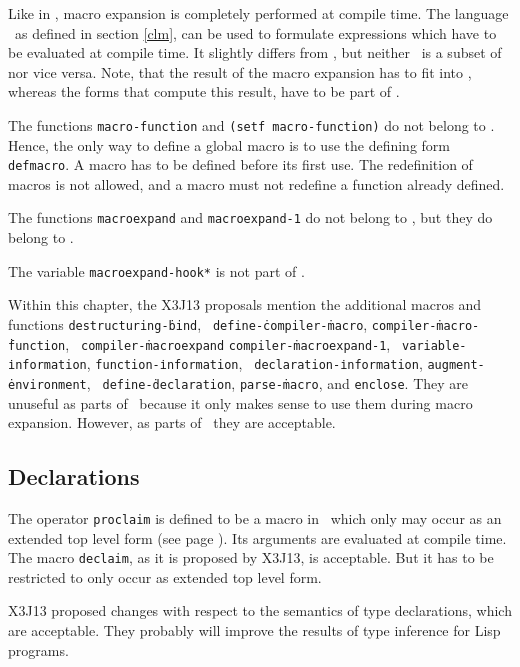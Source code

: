 Like in \CL, macro expansion is completely performed at compile time. The 
language \clm\, as defined in section \ref{clm}, can be used to 
formulate expressions which have to be evaluated at compile time. It 
slightly differs from , but neither \clm\ is a subset of  nor vice 
versa. Note, that the result of the macro expansion has to fit into , 
whereas the forms that compute this result, have to be part of \clm.

The functions {\tt macro-function} and {\tt (setf macro-function)} do not 
belong to . Hence, the only way to define a global macro is to use the 
defining form {\tt defmacro}. A macro has to be defined before its first 
use. The redefinition of macros is not allowed, and a macro must not 
redefine a function already defined.

The functions {\tt macroexpand} and {\tt macroexpand-1} do not belong to 
, but they do belong to \clm.


The variable {\tt *macroexpand-hook*} is not part of .

Within this chapter, the X3J13 proposals mention the additional macros
and functions {\tt destruc\-turing-\.bind}, {\tt
  define-\.compiler-\.macro}, {\tt compiler-\.macro-\.function}, {\tt
  compiler-\.macro\-expand} {\tt compiler-\.macro\-expand-1}, {\tt
  variable-\.infor\-mation}, {\tt function-\.information}, {\tt
  decla\-ration-\.infor\-mation}, {\tt augment-\.environment}, {\tt
  define-\.declaration}, {\tt parse-\.macro}, and {\tt enclose}. They
are unuseful as parts of \ because it only makes sense to use them
during macro expansion. However, as parts of \clm\ they are
acceptable.

\subsection{Declarations}

The operator {\tt proclaim} is defined to be a macro in \, which only 
may occur as an extended top level form (see page \pageref{erwTLF}). Its 
arguments are evaluated at compile time. The macro {\tt declaim}, as it is 
proposed by X3J13, is acceptable. But it has to be restricted to only occur as 
extended top level form.

X3J13 proposed changes with respect to the semantics of type declarations, 
which are acceptable. They probably will improve the results of type 
inference for Lisp programs.
 
